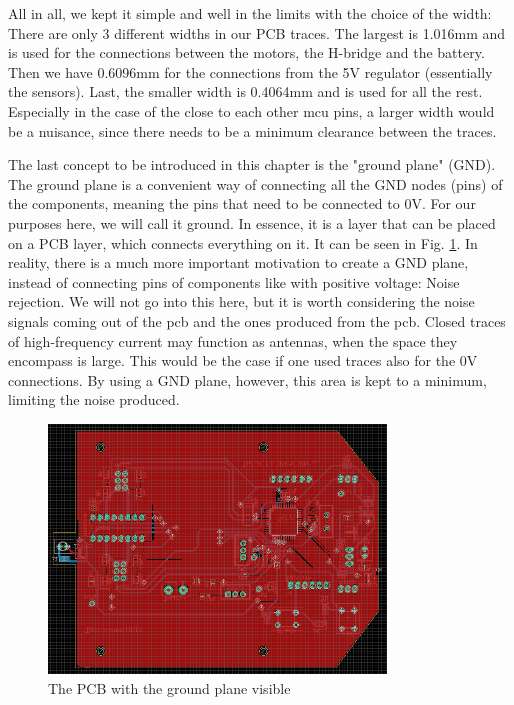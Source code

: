 All in all, we kept it simple and well in the limits with  the choice of the width: There are only 3 different widths in our PCB traces. The largest is 1.016mm and is used for the connections between the motors, the H-bridge and the battery. Then we have 0.6096mm for the connections from the 5V regulator (essentially the sensors). Last, the smaller width is 0.4064mm and is used for all the rest. Especially in the case of the close to each other mcu pins, a larger width would be a nuisance, since there needs to be a minimum clearance between the traces.

\vspace{1cm}

The last concept to be introduced in this chapter is the "ground plane" (GND). The ground plane is a convenient way of connecting all the GND nodes (pins) of the components, meaning the pins that need to be connected to 0V. For our purposes here, we will call it ground. In essence, it is a layer that can be placed on a PCB layer, which connects everything on it. It can be seen in Fig. \ref{fig:gnd}.
In reality, there is a much more important motivation to create a GND plane, instead of connecting pins of components like with positive voltage: Noise rejection. We will not go into this here, but it is worth considering the noise signals coming out of the pcb and the ones produced from the pcb. Closed traces of high-frequency current may function as antennas, when the space they encompass is large. This would be the case if one used traces also for the 0V connections. By using a GND plane, however, this area is kept to a minimum, limiting the noise produced.

\begin{figure}[htb]
    \centering
    \includegraphics[width=0.8\textwidth]{figures/hardware/PCB_Grounded.PNG}
    \caption{The PCB with the ground plane visible}
    \label{fig:gnd}
\end{figure}

